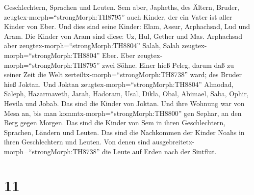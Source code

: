 Geschlechtern, Sprachen und Leuten.  Sem aber, Japheths,
des Ältern, Bruder, zeugtex-morph=``strongMorph:TH8795'' auch Kinder,
der ein Vater ist aller Kinder von Eber.  Und dies sind
seine Kinder: Elam, Assur, Arphachsad, Lud und Aram.  Die
Kinder von Aram sind diese: Uz, Hul, Gether und Mas. 
Arphachsad aber zeugtex-morph=``strongMorph:TH8804'' Salah, Salah
zeugtex-morph=``strongMorph:TH8804'' Eber.  Eber
zeugtex-morph=``strongMorph:TH8795'' zwei Söhne. Einer hieß Peleg, darum
daß zu seiner Zeit die Welt zerteiltx-morph=``strongMorph:TH8738'' ward;
des Bruder hieß Joktan.  Und Joktan
zeugtex-morph=``strongMorph:TH8804'' Almodad, Saleph, Hazarmaveth,
Jarah,  Hadoram, Usal, Dikla,  Obal, Abimael,
Saba,  Ophir, Hevila und Jobab. Das sind die Kinder von
Joktan.  Und ihre Wohnung war von Mesa an, bis man
kommtx-morph=``strongMorph:TH8800'' gen Sephar, an den Berg gegen
Morgen.  Das sind die Kinder von Sem in ihren
Geschlechtern, Sprachen, Ländern und Leuten.  Das sind die
Nachkommen der Kinder Noahs in ihren Geschlechtern und Leuten. Von denen
sind ausgebreitetx-morph=``strongMorph:TH8738'' die Leute auf Erden nach
der Sintflut.

\hypertarget{section-10}{%
\section{11}\label{section-10}}

